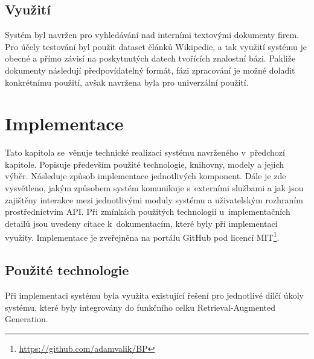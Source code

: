 \section{Využití}
Systém byl navržen pro vyhledávání nad interními textovými dokumenty firem. Pro účely testování byl použit dataset článků Wikipedie, a tak využití systému je obecné a přímo závisí na poskytnutých datech tvořících znalostní bázi. Pakliže dokumenty následují předpovídatelný formát, fázi zpracování je možné doladit konkrétnímu použití, avšak navržena byla pro univerzální použití.


\chapter{Implementace}
\label{implementace}
Tato kapitola se~věnuje technické realizaci systému navrženého v~předchozí kapitole. Popisuje především použité technologie, knihovny, modely a jejich výběr. Následuje způsob implementace jednotlivých komponent. Dále je zde vysvětleno, jakým způsobem systém komunikuje s~externími službami a jak jsou zajištěny interakce mezi jednotlivými moduly systému a uživatelským rozhraním prostřednictvím API. Při zmínkách použitých technologií u~implementačních detailů jsou uvedeny citace k~dokumentacím, které byly při implementaci využity. Implementace je zveřejněna na portálu GitHub pod licencí MIT\footnote{\url{https://github.com/adamvalik/BP}}.

\section{Použité technologie}
Při implementaci systému byla využita existující řešení pro jednotlivé dílčí úkoly systému, které byly integrovány do funkčního celku Retrieval-Augmented Generation. 

